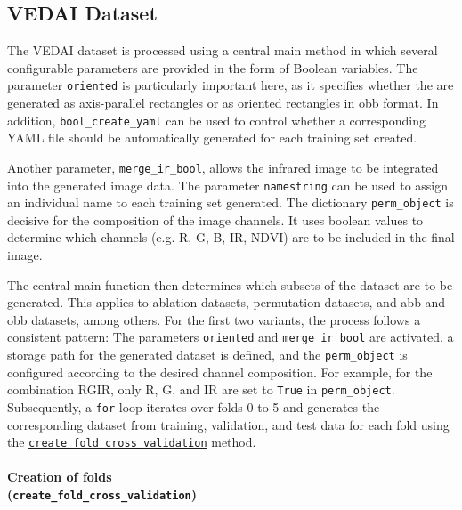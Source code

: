 \subsection{VEDAI Dataset}
\label{subsec:impl_VEDAI}


The \acrshort{VEDAI} dataset is processed using a central main method in which several configurable parameters are provided in the form of Boolean variables. The parameter \lstinline|oriented| is particularly important here, as it specifies whether the  are generated as axis-parallel rectangles or as oriented rectangles in \acrshort{obb} format. In addition, \lstinline|bool_create_yaml| can be used to control whether a corresponding \acrshort{YAML} file should be automatically generated for each training set created.

Another parameter, \lstinline|merge_ir_bool|, allows the infrared image to be integrated into the generated image data. The parameter \lstinline|namestring| can be used to assign an individual name to each training set generated. The dictionary \lstinline|perm_object| is decisive for the composition of the image channels. It uses boolean values to determine which channels (e.g. \acrshort{R}, \acrshort{G}, \acrshort{B}, \acrshort{IR}, \acrshort{NDVI}) are to be included in the final image.

The central main function then determines which subsets of the dataset are to be generated. This applies to ablation datasets, permutation datasets, and \acrshort{abb} and \acrshort{obb} datasets, among others. For the first two variants, the process follows a consistent pattern: The parameters \lstinline|oriented| and \lstinline|merge_ir_bool| are activated, a storage path for the generated dataset is defined, and the \lstinline|perm_object| is configured according to the desired channel composition. For example, for the combination \acrshort{RGIR}, only \acrshort{R}, \acrshort{G}, and \acrshort{IR} are set to \lstinline|True| in \lstinline|perm_object|. Subsequently, a \texttt{for} loop iterates over folds 0 to 5 and generates the corresponding dataset from training, validation, and test data for each fold using the \hyperlink{par:create_fold_cv}{\lstinline|create_fold_cross_validation|} method.

\paragraph{Creation of folds \\ (\lstinline|create_fold_cross_validation|)}
\hypertarget{par:create_fold_cv}{}

